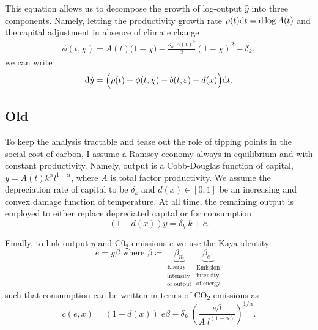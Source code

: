 \documentclass[../../main.tex]{subfiles}
\begin{document}
This equation allows us to decompose the growth of log-output $\hat y$ into three components. Namely, letting the productivity growth rate $\rho(t) \text{d} t = \text{d} \log A(t)$ and the capital adjustment in absence of climate change  \begin{align}
    \phi(t, \chi) = A(t) \big(1 - \chi\big) - \frac{\kappa_a \; A(t)^2}{2} (1 - \chi)^2 - \delta_k,
\end{align} we can write \begin{equation}
    \text{d} \hat y = \Big(\rho(t) + \phi(t, \chi) - b(t, \varepsilon) - d(x) \Big) \text{d} t.
\end{equation}

\iffalse
    \subsection{Old}
    To keep the analysis tractable and tease out the role of tipping points in the social cost of carbon, I assume a Ramsey economy always in equilibrium and with constant productivity. Namely, output is a Cobb-Douglas function of capital, $y = A(t) k^\alpha l^{1 - \alpha}$, where $A$ is total factor productivity. We assume the depreciation rate of capital to be $\delta_k$ and  $d(x) \in [0, 1]$ be an increasing and convex damage function of temperature. At all time, the remaining output is employed to either replace depreciated capital or for consumption \begin{equation}
        (1 - d(x)) y = \delta_k \ k + c.
    \end{equation}

    Finally, to link output $y$ and C0$_2$ emissions $e$ we use the Kaya identity \begin{equation}
        e = y \beta  \text{ where } \beta \coloneqq \underbrace{\beta_m}_{\substack{\text{Energy} \\ \text{intensity} \\ \text{of output}}} \underbrace{\beta_e,}_{\substack{\text{Emission} \\ \text{intensity} \\ \text{of energy}}}
    \end{equation} such that consumption can be written in terms of CO$_2$ emissions as \begin{equation}
        c(e, x) = (1 - d(x)) \; e \beta - \delta_k \; \left(\frac{e \beta}{A \; l^{(1 - \alpha)}}\right)^{1 / \alpha}. 
    \end{equation}
\end{document}
